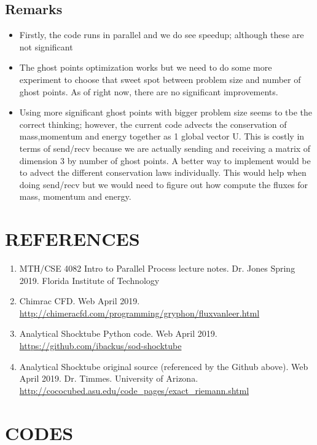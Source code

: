 \documentclass[12pt]{article}
\begin{document}
    \subsection{Remarks}
    \begin{itemize}
        \item Firstly, the code runs in parallel and we do see speedup; although these are not significant
        \item The ghost points optimization works but we need to do some more experiment to choose that sweet spot between problem size and number of ghost points. As of right now, there are no significant improvements. 
        \item Using more significant ghost points with bigger problem size seems to tbe the correct thinking; however, the current code advects the conservation of mass,momentum and energy together as 1 global vector U.  This is costly in terms of send/recv because we are actually sending and receiving a matrix of dimension 3 by number of ghost points. A better way to implement would be to advect the different conservation laws individually.  This would help when doing send/recv but we would need to figure out how compute the fluxes for mass, momentum and energy.     
    \end{itemize}

    \newpage
    \section{REFERENCES}
    \begin{enumerate}
        \item MTH/CSE 4082 Intro to Parallel Process lecture notes.  Dr. Jones Spring 2019. Florida Institute of Technology
        \item Chimrac CFD.  Web April 2019. \url{http://chimeracfd.com/programming/gryphon/fluxvanleer.html}
        \item Analytical Shocktube Python code. Web April 2019. \url{https://github.com/ibackus/sod-shocktube}
        \item Analytical Shocktube original source (referenced by the Github above). Web April 2019. Dr. Timmes. University of Arizona. \url{http://cococubed.asu.edu/code_pages/exact_riemann.shtml}
        
    \end{enumerate}

    \newpage
    \section{CODES}
\end{document}
